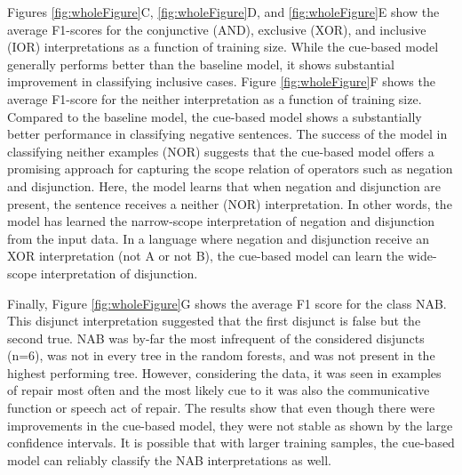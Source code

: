 \documentclass[
  english,
  ,man,floatsintext]{apa6}
\begin{document}
Figures \ref{fig:wholeFigure}C, \ref{fig:wholeFigure}D, and \ref{fig:wholeFigure}E show the average F1-scores for the conjunctive (AND), exclusive (XOR), and inclusive (IOR) interpretations as a function of training size. While the cue-based model generally performs better than the baseline model, it shows substantial improvement in classifying inclusive cases. Figure \ref{fig:wholeFigure}F shows the average F1-score for the neither interpretation as a function of training size. Compared to the baseline model, the cue-based model shows a substantially better performance in classifying negative sentences. The success of the model in classifying neither examples (NOR) suggests that the cue-based model offers a promising approach for capturing the scope relation of operators such as negation and disjunction. Here, the model learns that when negation and disjunction are present, the sentence receives a neither (NOR) interpretation. In other words, the model has learned the narrow-scope interpretation of negation and disjunction from the input data. In a language where negation and disjunction receive an XOR interpretation (not A or not B), the cue-based model can learn the wide-scope interpretation of disjunction.

Finally, Figure \ref{fig:wholeFigure}G shows the average F1 score for the class NAB. This disjunct interpretation suggested that the first disjunct is false but the second true. NAB was by-far the most infrequent of the considered disjuncts (n=6), was not in every tree in the random forests, and was not present in the highest performing tree. However, considering the data, it was seen in examples of repair most often and the most likely cue to it was also the communicative function or speech act of repair. The results show that even though there were improvements in the cue-based model, they were not stable as shown by the large confidence intervals. It is possible that with larger training samples, the cue-based model can reliably classify the NAB interpretations as well.
\end{document}
